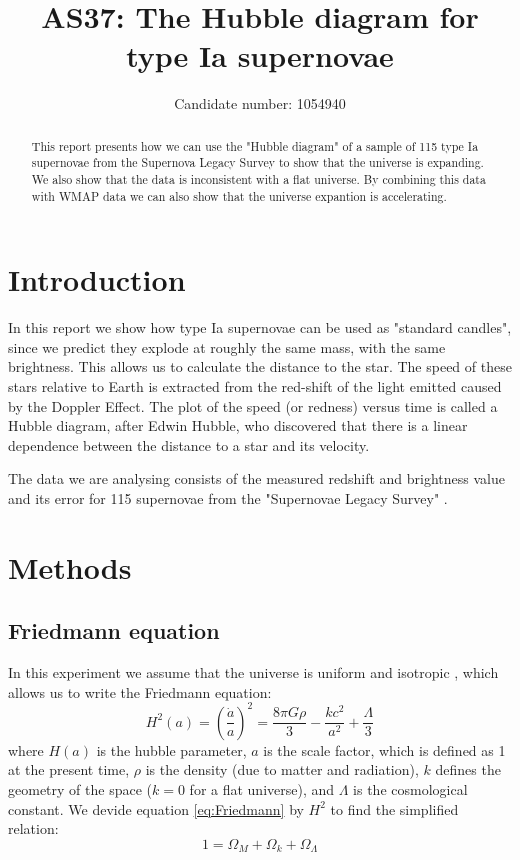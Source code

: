 \documentclass[11pt]{article}
\title{AS37: The Hubble diagram for type Ia supernovae}
\author{Candidate number: 1054940}
\begin{document}
\maketitle


\begin{abstract}
This report presents how we can use the "Hubble diagram" of a sample of 115 type Ia supernovae from the Supernova Legacy Survey to show that the universe is expanding. We also show that the data is inconsistent with a flat universe. By combining this data with WMAP data we can also show that the universe expantion is accelerating. 
\end{abstract}


\section{Introduction}
In this report we show how type Ia supernovae can be used as "standard candles", since we predict they explode at roughly the same mass, with the same brightness. This allows us to calculate the distance to the star. The speed of these stars relative to Earth is extracted from the red-shift of the light emitted caused by the Doppler Effect. The plot of the speed (or redness) versus time is called a Hubble diagram, after Edwin Hubble, who discovered that there is a linear dependence between the distance to a star and its velocity. 

The data we are analysing consists of the measured redshift and brightness value and its error for 115 supernovae from the "Supernovae Legacy Survey" \cite{SN_legacy_survey}. 


\section{Methods}
\subsection{Friedmann equation}
In this experiment we assume that the universe is uniform and isotropic \cite{AS37_lab_script}, which allows us to write the Friedmann equation: 
\begin{equation}
	H^2(a) = \left( \frac{\dot{a}}{a} \right)^2 = \frac{8 \pi G \rho}{3} - \frac{kc^2}{a^2} + \frac{\Lambda}{3}
	\label{eq:Friedmann}
\end{equation}
where $H(a)$ is the hubble parameter, $a$ is the scale factor, which is defined as 1 at the present time, $\rho$ is the density (due to matter and radiation), $k$ defines the geometry of the space ($k=0$ for a flat universe), and $\Lambda$ is the cosmological constant. We devide equation \eqref{eq:Friedmann} by $H^2$ to find the simplified relation: 
\begin{equation}
	1 = \Omega_M +\Omega_k + \Omega_\Lambda
	\label{eq:main}
\end{equation}
\end{document}
